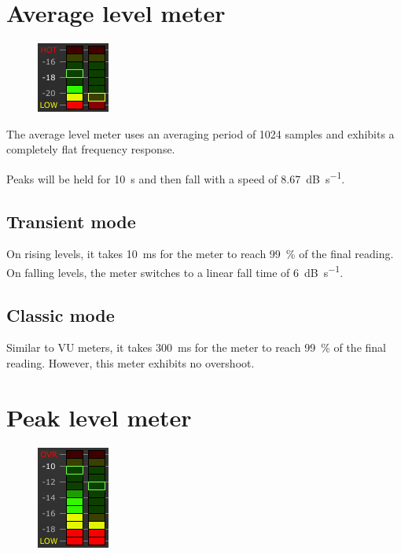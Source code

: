 \section{Average level meter}

\begin{figure}
  \includegraphics[scale=0.625,clip]{include/images/level_meter_average.png}
\end{figure}

The average level meter uses an averaging period of \num{1024} samples
and exhibits a completely flat frequency response.

Peaks will be held for \SI{10}{\second} and then fall with a speed of
\SI{8.67}{\dB\per\second}.

\subsection{Transient mode}

On rising levels, it takes \SI{10}{\milli\second} for the meter to
reach \SI{99}{\percent} of the final reading.  On falling levels, the
meter switches to a linear fall time of \SI{6}{\dB\per\second}.

\subsection{Classic mode}

Similar to VU meters, it takes \SI{300}{\milli\second} for the meter
to reach \SI{99}{\percent} of the final reading.  However, this meter
exhibits no overshoot.

\section{Peak level meter}

\begin{figure}
  \includegraphics[scale=0.625,clip]{include/images/level_meter_peak.png}
\end{figure}

